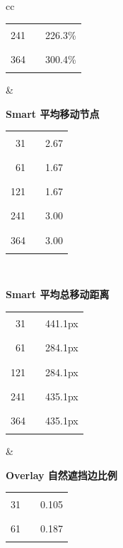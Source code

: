 \documentclass[11pt,a4paper,oneside,extrafontsizes]{memoir}
\begin{document}
\begin{center}
\begin{figure}[htbp]
\begin{tabular}{cc}
\begin{minipage}[t]{0.46\textwidth}
\begin{tabular}{@{}r l r@{}}
241 & \textcolor{blue!70!black}{\rule{0.1507\textwidth}{1.1ex}} & 226.3\% \\
364 & \textcolor{blue!70!black}{\rule{0.2000\textwidth}{1.1ex}} & 300.4\% \\
\end{tabular}
\end{minipage}
&
\begin{minipage}[t]{0.46\textwidth}
\centering
\textbf{Smart 平均移动节点}\\[-0.2em]
\begin{tabular}{@{}r l r@{}}
31 & \textcolor{blue!70!black}{\rule{0.1780\textwidth}{1.1ex}} & 2.67 \\
61 & \textcolor{blue!70!black}{\rule{0.1113\textwidth}{1.1ex}} & 1.67 \\
121 & \textcolor{blue!70!black}{\rule{0.1113\textwidth}{1.1ex}} & 1.67 \\
241 & \textcolor{blue!70!black}{\rule{0.2000\textwidth}{1.1ex}} & 3.00 \\
364 & \textcolor{blue!70!black}{\rule{0.2000\textwidth}{1.1ex}} & 3.00 \\
\end{tabular}
\end{minipage} \\[1.2em]
\begin{minipage}[t]{0.46\textwidth}
\centering
\textbf{Smart 平均总移动距离}\\[-0.2em]
\begin{tabular}{@{}r l r@{}}
31 & \textcolor{blue!70!black}{\rule{0.2000\textwidth}{1.1ex}} & 441.1px \\
61 & \textcolor{blue!70!black}{\rule{0.1288\textwidth}{1.1ex}} & 284.1px \\
121 & \textcolor{blue!70!black}{\rule{0.1288\textwidth}{1.1ex}} & 284.1px \\
241 & \textcolor{blue!70!black}{\rule{0.1973\textwidth}{1.1ex}} & 435.1px \\
364 & \textcolor{blue!70!black}{\rule{0.1973\textwidth}{1.1ex}} & 435.1px \\
\end{tabular}
\end{minipage}
&
\begin{minipage}[t]{0.46\textwidth}
\centering
\textbf{Overlay 自然遮挡边比例}\\[-0.2em]
\begin{tabular}{@{}r l r@{}}
31 & \textcolor{blue!70!black}{\rule{0.0572\textwidth}{1.1ex}} & 0.105 \\
61 & \textcolor{blue!70!black}{\rule{0.1017\textwidth}{1.1ex}} & 0.187 \\

\end{tabular}
\end{minipage}
\end{tabular}
\end{figure}
\end{center}
\end{document}
